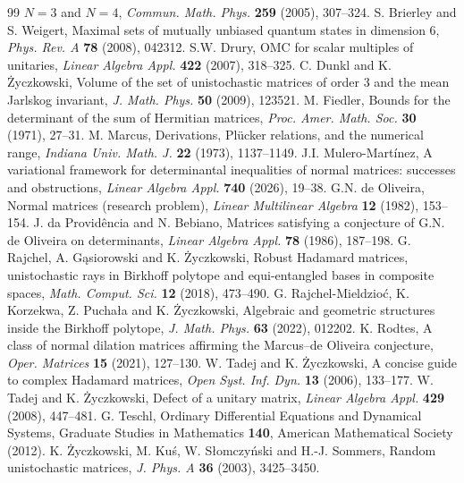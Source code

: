 \documentclass[11pt,a4paper]{article}
\begin{document}
\begin{thebibliography}{99}
$N=3$ and $N=4$, \emph{Commun. Math. Phys.} \textbf{259} (2005), 307--324.
 S. Brierley and S. Weigert, Maximal sets of mutually unbiased
quantum states in dimension 6, \emph{Phys. Rev. A} \textbf{78} (2008), 042312.
 S.W. Drury, OMC for scalar multiples of unitaries,
\emph{Linear Algebra Appl.} \textbf{422} (2007), 318--325.
 C. Dunkl and K. \.Zyczkowski, Volume of the set of
unistochastic matrices of order 3 and the mean Jarlskog invariant,
\emph{J. Math. Phys.} \textbf{50} (2009), 123521.
 M. Fiedler, Bounds for the determinant of the sum of
Hermitian matrices, \emph{Proc. Amer. Math. Soc.} \textbf{30} (1971), 27--31.
 M. Marcus, Derivations, Pl\"ucker relations, and the numerical
range, \emph{Indiana Univ. Math. J.} \textbf{22} (1973), 1137--1149.
 J.I. Mulero-Mart\'inez, A variational framework for
determinantal inequalities of normal matrices: successes and obstructions,
\emph{Linear Algebra Appl.} \textbf{740} (2026), 19--38.
 G.N. de Oliveira, Normal matrices (research problem),
\emph{Linear Multilinear Algebra} \textbf{12} (1982), 153--154.
 J. da Provid\^encia and N. Bebiano, Matrices satisfying a
conjecture of G.N. de Oliveira on determinants,
\emph{Linear Algebra Appl.} \textbf{78} (1986), 187--198.
 G. Rajchel, A. G\k{a}siorowski and K. \.Zyczkowski,
Robust Hadamard matrices, unistochastic rays in Birkhoff polytope and
equi-entangled bases in composite spaces,
\emph{Math. Comput. Sci.} \textbf{12} (2018), 473--490.
 G. Rajchel-Mieldzio\'c, K. Korzekwa, Z. Pucha\l a and
K. \.Zyczkowski, Algebraic and geometric structures inside the Birkhoff
polytope, \emph{J. Math. Phys.} \textbf{63} (2022), 012202.
 K. Rodtes, A class of normal dilation matrices affirming the
Marcus--de Oliveira conjecture, \emph{Oper. Matrices} \textbf{15} (2021), 127--130.
 W. Tadej and K. \.Zyczkowski,
A concise guide to complex Hadamard matrices,
\emph{Open Syst. Inf. Dyn.} \textbf{13} (2006), 133--177.
 W. Tadej and K. \.Zyczkowski, Defect of a unitary matrix,
\emph{Linear Algebra Appl.} \textbf{429} (2008), 447--481.
 G. Teschl, Ordinary Differential Equations and
Dynamical Systems, Graduate Studies in Mathematics \textbf{140},
American Mathematical Society (2012).
 K. \.Zyczkowski, M. Ku\'s, W. S\l omczy\'nski and
H.-J. Sommers, Random unistochastic matrices,
\emph{J. Phys. A} \textbf{36} (2003), 3425--3450.
\end{thebibliography}
\end{document}
